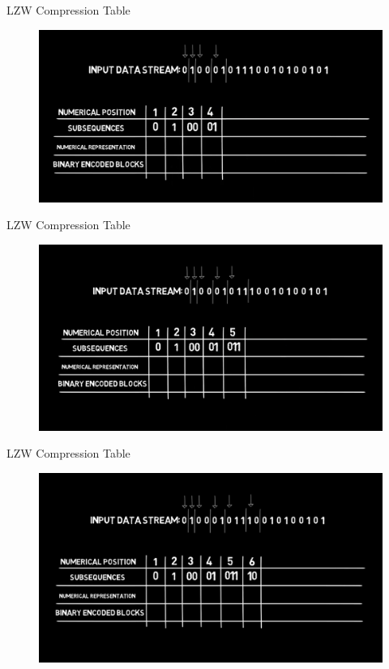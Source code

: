 \documentclass{beamer}
\begin{document}
\begin{frame}[fragile]{LZW Compression Table}
\begin{figure}
\centering
\includegraphics[width=\textwidth]{assets/4.png}
\end{figure}
\end{frame}
\begin{frame}[fragile]{LZW Compression Table}
\begin{figure}
\centering
\includegraphics[width=\textwidth]{assets/5.png}
\end{figure}
\end{frame}
\begin{frame}[fragile]{LZW Compression Table}
\begin{figure}
\centering
\includegraphics[width=\textwidth]{assets/6.png}
\end{figure}
\end{frame}
\end{document}
